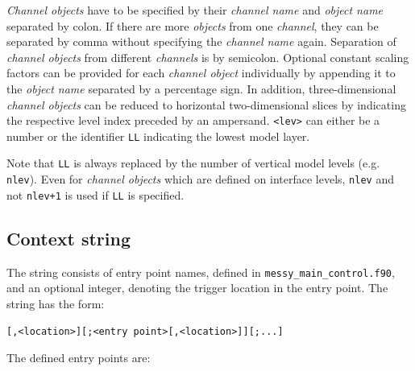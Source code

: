 \documentclass[twoside]{article}
\begin{document}
{\it Channel objects} have to be specified by their {\it channel name} and {\it object name} separated by colon.
If there are more {\it objects} from one {\it channel}, they can be separated by comma without specifying the {\it channel name} again.
Separation of {\it channel objects} from different {\it channels} is by semicolon.
Optional constant scaling factors can be provided for each {\it channel object} individually by appending it to the {\it object name} separated by a percentage sign.
In addition, three-dimensional {\it channel objects} can be reduced to horizontal two-dimensional slices by indicating the respective level index preceded by an ampersand. {\tt <lev>} can either be a number or the identifier {\tt LL} indicating the lowest model layer.

Note that {\tt LL} is always replaced by the number of vertical model levels (e.g. {\tt nlev}).
Even for {\it channel objects} which are defined on interface levels, {\tt nlev} and not {\tt nlev+1} is used if {\tt LL}  is specified.
%
\subsection{Context string}
\label{sec:contextstring}
%
The string consists of entry point names, defined in {\tt messy\_main\_control.f90}, and an optional integer, denoting the trigger location in the entry point.
The string has the form:

{\tt <entry point>[,<location>][;<entry point>[,<location>]][;...]}

The defined entry points are:
\end{document}
